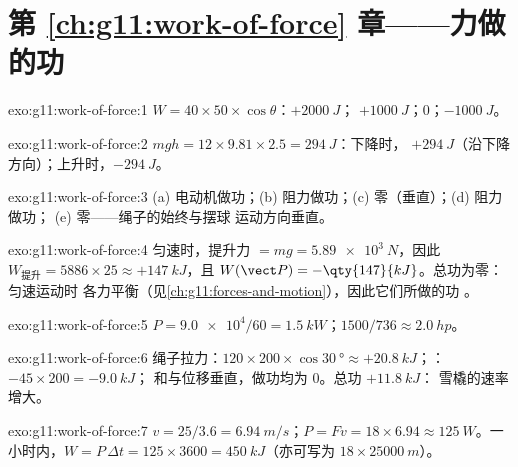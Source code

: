 \section*{第 \ref{ch:g11:work-of-force} 章——力做的功}

\begin{solution}{exo:g11:work-of-force:1}
$W = 40 \times 50 \times \cos\theta$：$+\qty{2000}{J}$；
$+\qty{1000}{J}$；$0$；$-\qty{1000}{J}$。
\end{solution}

\begin{solution}{exo:g11:work-of-force:2}
$mgh = 12 \times 9.81 \times 2.5 = \qty{294}{J}$：下降时，
$+\qty{294}{J}$（沿下降方向）；上升时，$-\qty{294}{J}$。
\end{solution}

\begin{solution}{exo:g11:work-of-force:3}
(a) 电动机做功；(b) 阻力做功；(c) 零（垂直）；(d) 阻力做功；
(e) 零——绳子的始终与摆球
运动方向垂直。
\end{solution}

\begin{solution}{exo:g11:work-of-force:4}
匀速时，提升力 $= mg = \qty{5.89e3}{N}$，因此
$W_{\text{提升}} = 5886 \times 25 \approx +\qty{147}{kJ}$，且
$W(\vect P) = -\qty{147}{kJ}$。总功为零：匀速运动时
各力平衡（见\cref{ch:g11:forces-and-motion}），因此它们所做的功
。
\end{solution}

\begin{solution}{exo:g11:work-of-force:5}
$P = \num{9.0e4}/60 = \qty{1.5}{kW}$；$1500/736 \approx \qty{2.0}{hp}$。
\end{solution}

\begin{solution}{exo:g11:work-of-force:6}
绳子拉力：$120 \times 200 \times \cos\qty{30}{\degree} \approx
+\qty{20.8}{kJ}$；：$-45 \times 200 = -\qty{9.0}{kJ}$；
和与位移垂直，做功均为 $0$。总功 $+\qty{11.8}{kJ}$：
雪橇的速率增大。
\end{solution}

\begin{solution}{exo:g11:work-of-force:7}
$v = 25/3.6 = \qty{6.94}{m/s}$；$P = Fv = 18 \times 6.94 \approx
\qty{125}{W}$。一小时内，$W = P\,\Delta t = 125 \times 3600 =
\qty{450}{kJ}$（亦可写为 $18 \times \qty{25000}{m}$）。
\end{solution}


